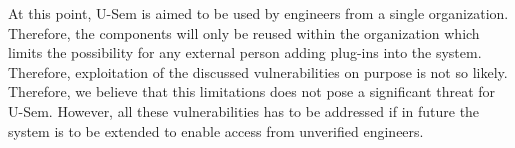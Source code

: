 At this point, U-Sem is aimed to be used by engineers from a single organization. Therefore, the components will only be reused within the organization which limits the possibility for any external person adding plug-ins into the system. Therefore, exploitation of the discussed vulnerabilities on purpose is not so likely. Therefore, we believe that this limitations does not pose a significant threat for U-Sem. However, all these vulnerabilities has to be addressed if in future the system is to be extended to enable access from unverified engineers. 
